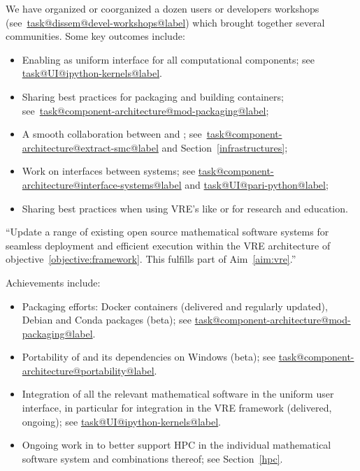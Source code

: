 \documentclass{deliverablereport}
\makeatletter
\newcommand\localtaskref[2]{\hyperref[#1@#2]{\csname task@#1@#2@label\endcsname}}
\makeatother
\begin{document}
\begin{compactenum}
  We have organized or coorganized a dozen users or developers
  workshops (see~\localtaskref{dissem}{devel-workshops}) which brought
  together several communities. Some key outcomes include:
  \begin{itemize}
  \item Enabling \Jupyter as uniform interface for all computational
    components; see \localtaskref{UI}{ipython-kernels}.
  \item Sharing best practices for packaging and building
    containers;
    see~\localtaskref{component-architecture}{mod-packaging};
  \item A smooth collaboration between \JupyterHub and \SMC;
    see~\localtaskref{component-architecture}{extract-smc} and
    Section~\ref{infrastructures};
  \item Work on interfaces between systems; see
    \localtaskref{component-architecture}{interface-systems} and
    \localtaskref{UI}{pari-python};
  \item Sharing best practices when using VRE's like \SMC or \Jupyter
    for research and education.
  \end{itemize}

\item \label{objective:updates} ``Update a range of existing open source
  mathematical software systems for seamless deployment and efficient
  execution within the VRE architecture of objective~\ref{objective:framework}.
  This fulfills part of Aim~\ref{aim:vre}.''

  Achievements include:
  \begin{itemize}
  \item Packaging efforts: Docker containers (delivered and
    regularly updated), Debian and Conda packages (beta); see
    \localtaskref{component-architecture}{mod-packaging}.
  \item Portability of \Sage and its dependencies on Windows (beta);
    see \localtaskref{component-architecture}{portability}.
  \item Integration of all the relevant mathematical software in the
    uniform \Jupyter user interface, in particular for integration in
    the VRE framework (delivered, ongoing); see
    \localtaskref{UI}{ipython-kernels}.
  \item Ongoing work in  to better support HPC in the
    individual mathematical software system and combinations thereof;
    see Section~\ref{hpc}.
  \end{itemize}


\end{compactenum}
\end{document}
